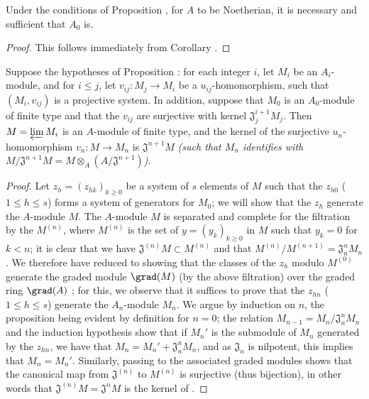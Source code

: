 \begin{corollary}[7.2.8]
\label{0.7.2.8}
Under the conditions of Proposition , for $A$ to
be Noetherian, it is necessary and sufficient that $A_0$ is.
\end{corollary}

\begin{proof}
\label{proof-0.7.2.8}
This follows immediately from Corollary .
\end{proof}

\begin{proposition}[7.2.9]
\label{0.7.2.9}
Suppose the hypotheses of Proposition : for each integer $i$,
let $M_i$ be an $A_i$-module, and for $i\leq j$, let $v_{ij}:M_j\to M_i$ be a
$u_{ij}$-homomorphism, such that $(M_i,v_{ij})$ is a projective system. In addition, suppose
that $M_0$ is an $A_0$-module of finite type and that the $v_{ij}$ are surjective with kernel
$\mathfrak{J}_j^{i+1}M_j$. Then $M=\varprojlim M_i$ is an $A$-module of finite type, and the
kernel of the surjective $u_n$-homomorphism $v_n:M\to M_n$ is $\mathfrak{J}^{n+1}M$
\emph{(such that $M_n$ identifies with
$M/\mathfrak{J}^{n+1}M=M\otimes_A(A/\mathfrak{J}^{n+1})$)}.
\end{proposition}

\begin{proof}
\label{proof-0.7.2.9}
Let $z_h=(z_{hk})_{k\geq 0}$ be a system of $s$ elements of $M$ such that the $z_{h0}$
($1\leq h\leq s$) forms a system of generators for $M_0$; we will show that the
$z_h$ generate the $A$-module $M$. The $A$-module $M$ is separated and complete for the
filtration by the $M^{(n)}$, where $M^{(n)}$ is the set of $y=(y_k)_{k\geq 0}$ in $M$
such that $y_k=0$ for $k<n$; it is clear that we have $\mathfrak{J}^{(n)}M\subset M^{(n)}$
and that $M^{(n)}/M^{(n+1)}=\mathfrak{J}_n^n M_n$. We therefore have reduced to showing that
the classes of the $z_h$ modulo $M^{(0)}$ generate the graded module $\grad(M)$ (by the
above filtration) over the graded ring $\grad(A)$ \cite[p.~18--06, lemme]{I-1}; for this, we
observe that it suffices to prove that the $z_{hn}$ ($1\leq h\leq s$) generate the
$A_n$-module $M_n$. We argue by induction on $n$, the proposition being evident by definition
for $n=0$; the relation $M_{n-1}=M_n/\mathfrak{J}_n^n M_n$ and the induction hypothesis show
that if $M_n'$ is the submodule of $M_n$ generated by the $z_{hn}$, we have that
$M_n=M_n'+\mathfrak{J}_n^n M_n$, and as $\mathfrak{J}_n$ is nilpotent, this implies that
$M_n=M_n'$. Similarly, passing to the associated graded modules shows that the canonical map
from $\mathfrak{J}^{(n)}$ to $M^{(n)}$ is surjective (thus bijection), in other words that
$\mathfrak{J}^{(n)}M=\mathfrak{J}^n M$ is the kernel of .
\end{proof}

